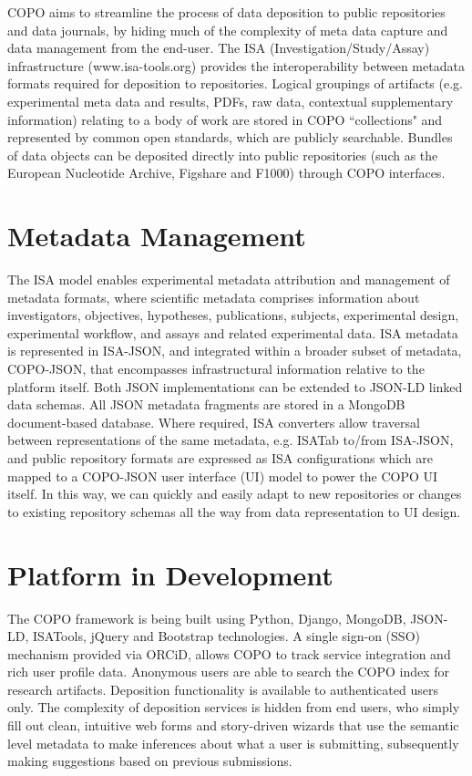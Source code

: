 \documentclass[runningheads,a4paper]{llncs}
\begin{document}
COPO aims to streamline the process of data deposition to public
repositories and data journals, by hiding much of the complexity of meta data capture and data management from the end-user. The ISA (Investigation/Study/Assay)  infrastructure (www.isa-tools.org) provides the interoperability between metadata formats required for deposition to repositories. Logical groupings of artifacts (e.g. experimental meta data and results, PDFs, raw data, contextual supplementary information) relating to a body of work are stored in COPO ``collections" and represented by common open standards, which are publicly searchable. Bundles of data objects can be deposited directly into public repositories (such as the European Nucleotide Archive, Figshare and F1000) through COPO interfaces.



\vspace*{-0.3in}
\section{Metadata Management}

The ISA model enables experimental metadata attribution and management of metadata formats, where scientific metadata comprises information about investigators,
objectives, hypotheses, publications, subjects, experimental design,
experimental workflow, and assays and related experimental data. ISA
metadata is represented in ISA-JSON, and integrated within a broader
subset of metadata, COPO-JSON, that encompasses infrastructural
information relative to the platform itself. Both JSON implementations
can be extended to JSON-LD linked data schemas. All JSON metadata
fragments are stored in a MongoDB document-based database.
Where required, ISA converters allow traversal between representations
of the same metadata, e.g. ISATab to/from ISA-JSON, and public
repository formats are expressed as ISA configurations which are
mapped to a COPO-JSON user interface (UI) model to power the COPO UI
itself. In this way, we can quickly and easily adapt to new
repositories or changes to existing repository schemas all the way
from data representation to UI design.

\vspace*{-0.1in}
\section{Platform in Development}


The COPO framework is being built using Python, Django, MongoDB,
JSON-LD, ISATools, jQuery and Bootstrap technologies. A single sign-on (SSO) mechanism provided via ORCiD, allows COPO to track
service integration and rich user profile data. Anonymous users are
able to search the COPO index for research artifacts. Deposition functionality is available to authenticated users only. The complexity of deposition services is hidden from end users, who simply fill out clean, intuitive web forms and story-driven wizards that use the semantic level metadata to make inferences about what a user is submitting, subsequently making suggestions based on previous
submissions.
\end{document}
